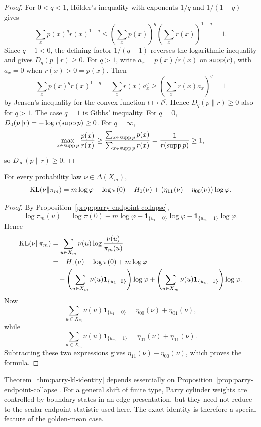 \begin{proof}
For \(0<q<1\), H\"older's inequality with exponents \(1/q\) and
\(1/(1-q)\) gives
\[
\sum_x p(x)^q r(x)^{1-q}\le
\left(\sum_xp(x)\right)^q\left(\sum_xr(x)\right)^{1-q}=1.
\]
Since \(q-1<0\), the defining factor \(1/(q-1)\) reverses the logarithmic
inequality and gives \(D_q(p\|r)\ge0\).  For \(q>1\), write
\(a_x=p(x)/r(x)\) on \(\operatorname{supp}(r)\), with \(a_x=0\) when \(r(x)>0=p(x)\).
Then
\[
\sum_xp(x)^qr(x)^{1-q}=\sum_x r(x)a_x^q
\ge \left(\sum_xr(x)a_x\right)^q=1
\]
by Jensen's inequality for the convex function \(t\mapsto t^q\).  Hence
\(D_q(p\|r)\ge0\) also for \(q>1\).  The case \(q=1\) is Gibbs'
inequality.  For \(q=0\), \(D_0(p\|r)=-\log r(\operatorname{supp} p)\ge0\).  For
\(q=\infty\),
\[
\max_{x\in\operatorname{supp} p}\frac{p(x)}{r(x)}
\ge
\frac{\sum_{x\in\operatorname{supp} p}p(x)}{\sum_{x\in\operatorname{supp} p}r(x)}
=\frac1{r(\operatorname{supp} p)}\ge1,
\]
so \(D_\infty(p\|r)\ge0\).
\end{proof}

\begin{theorem}\label{thm:parry-kl-identity}
For every probability law \(\nu\in\Delta(X_m)\),
\[
\operatorname{KL}(\nu\|\pi_m)
=
m\log\varphi-\log\pi(0)-H_1(\nu)
+
\bigl(\eta_{11}(\nu)-\eta_{00}(\nu)\bigr)\log\varphi.
\]
\end{theorem}

\begin{proof}
By Proposition~\ref{prop:parry-endpoint-collapse},
\[
\log \pi_m(u)
=
\log\pi(0)-m\log\varphi
+
\mathbf{1}_{\{u_1=0\}}\log\varphi
-
\mathbf{1}_{\{u_m=1\}}\log\varphi.
\]
Hence
\[
\begin{aligned}
\operatorname{KL}(\nu\|\pi_m)
&=
\sum_{u\in X_m}\nu(u)\log\frac{\nu(u)}{\pi_m(u)}\\
&=
-H_1(\nu)-\log\pi(0)+m\log\varphi\\
&\quad
-\left(\sum_{u\in X_m}\nu(u)\mathbf{1}_{\{u_1=0\}}\right)\log\varphi
+
\left(\sum_{u\in X_m}\nu(u)\mathbf{1}_{\{u_m=1\}}\right)\log\varphi.
\end{aligned}
\]
Now
\[
\sum_{u\in X_m}\nu(u)\mathbf{1}_{\{u_1=0\}}
=
\eta_{00}(\nu)+\eta_{01}(\nu),
\]
while
\[
\sum_{u\in X_m}\nu(u)\mathbf{1}_{\{u_m=1\}}
=
\eta_{01}(\nu)+\eta_{11}(\nu).
\]
Subtracting these two expressions gives
\(\eta_{11}(\nu)-\eta_{00}(\nu)\), which proves the formula.
\end{proof}

\begin{remark}\label{rem:endpoint-collapse-specificity}
Theorem~\ref{thm:parry-kl-identity} depends essentially on
Proposition~\ref{prop:parry-endpoint-collapse}. For a general shift of finite
type, Parry cylinder weights are controlled by boundary states in an edge
presentation, but they need not reduce to the scalar endpoint statistic used
here.  The exact identity is therefore a special feature of the golden-mean
case.
\end{remark}

